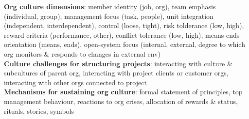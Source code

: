 \documentclass[a4paper]{article}
\begin{document}
\begin{multicols}{2}
        \textbf{Org culture dimensions}: member identity (job, org), team emphasis (individual, group), management focus (task, people), unit integration (independent, interdependent), control (loose, tight), risk tolderance (low, high), reward criteria (performance, other), conflict tolerance (low, high), means-ends orientation (means, ends), open-system focus (internal, external, degree to which org monitors \& responds to changes in external env)\\
        \textbf{Culture challenges for structuring projects}: interacting with culture \& subcultures of parent org, interacting with project clients or customer orgs, interacting with other orgs connected to project\\
        \textbf{Mechanisms for sustaining org culture}: formal statement of principles, top management behaviour, reactions to org crises, allocation of rewards \& status, rituals, stories, symbols\\
    \end{multicols}
    
\end{document}
